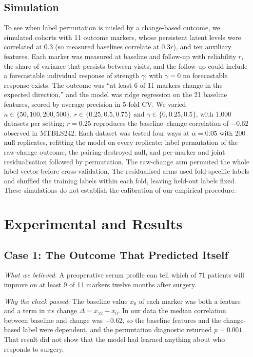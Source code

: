 \documentclass[conference]{IEEEtran}
\begin{document}
\subsection{Simulation}
\label{sec:simdesign}
To see when label permutation is misled by a change-based outcome, we
simulated cohorts with 11 outcome markers, whose persistent latent levels
were correlated at 0.3 (so measured baselines correlate at $0.3r$), and ten
auxiliary features. Each marker was measured at
baseline and follow-up with reliability $r$, the share of variance that
persists between visits, and the follow-up could include a forecastable
individual response of strength $\gamma$; with $\gamma=0$ no forecastable
response exists. The outcome was ``at least 6 of 11 markers change in the
expected direction,'' and the model was ridge regression on the 21 baseline
features, scored by average precision in 5-fold CV. We varied
$n\in\{50,100,200,500\}$, $r\in\{0.25,0.5,0.75\}$ and
$\gamma\in\{0,0.25,0.5\}$, with 1{,}000 datasets per setting; $r=0.25$
reproduces the baseline--change correlation of $-0.62$ observed in MTBLS242.
Each dataset was tested four ways at $\alpha=0.05$ with 200 null replicates,
refitting the model on every replicate: label permutation of the raw-change
outcome, the pairing-destroyed null, and per-marker and joint
residualisation followed by permutation. The raw-change arm permuted the
whole label vector before cross-validation. The residualised arms used
fold-specific labels and shuffled the training labels within each fold,
leaving held-out labels fixed. These simulations do not establish the
calibration of our empirical procedure.

\section{Experimental and Results}
\label{sec:results}

\subsection{Case 1: The Outcome That Predicted Itself}
\label{sec:case1}

\emph{What we believed.} A preoperative serum profile can tell which of 71
patients will improve on at least 9 of 11 markers twelve months after
surgery.

\emph{Why the check passed.} The baseline value $x_0$ of each marker was both
a feature and a term in its change $\Delta = x_{12}-x_0$. In our data the
median correlation between baseline and change was $-0.62$, so the baseline
features and the change-based label were dependent, and the permutation
diagnostic returned $p=0.001$. That result did not show that the model had
learned anything about who responds to surgery.
\end{document}
